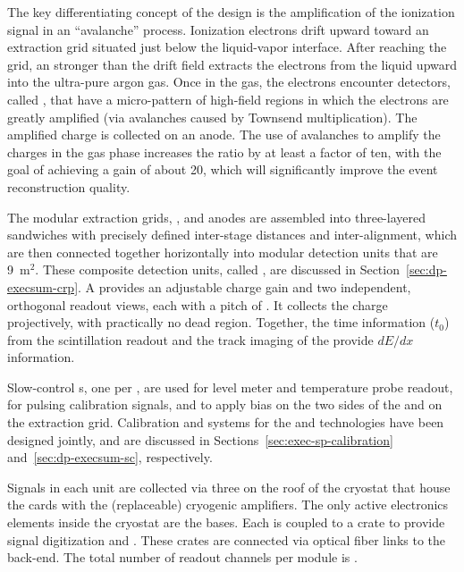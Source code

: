 The key differentiating concept of the  design is the amplification of the ionization signal in an ``avalanche'' process.  Ionization electrons drift upward toward an extraction grid situated just below the liquid-vapor interface. After reaching the grid, an \efield stronger than the drift field extracts the electrons from the liquid upward into the ultra-pure argon gas. 
Once in the gas, the electrons encounter detectors, called , that have a micro-pattern of high-field regions in which the electrons are greatly amplified (via avalanches caused by Townsend multiplication). 
The amplified charge is collected on an anode. The use of avalanches to amplify the charges in the gas phase increases the  ratio by at least
a factor of ten, with the goal of achieving a gain of about 20, which will significantly improve the
event reconstruction quality.



The modular extraction grids, , and anodes are assembled into three-layered sandwiches with precisely defined inter-stage distances and inter-alignment,  which are then connected together horizontally into modular detection units that are \num{9}~m$^2$. These composite detection units, called , are discussed in Section~\ref{sec:dp-execsum-crp}.
A  provides an adjustable charge gain and two independent, orthogonal readout views, each with a pitch of \dpstrippitch. It collects the charge projectively, with practically no dead region. Together, the time information  ($t_0$) from the  scintillation readout and the  \threed track imaging of the  provide $dE/dx$ information.  

Slow-control \fdth{}s,  one per , are used for level meter and temperature probe readout,  for pulsing calibration signals, and to apply  bias on the two sides of the  and on the extraction grid. Calibration and  systems for the  and  technologies have been designed jointly, and are discussed in Sections~\ref{sec:exec-sp-calibration} and~\ref{sec:dp-execsum-sc}, respectively.

Signals in each  unit are collected via three  on the roof of the cryostat that house the  cards with the (replaceable) cryogenic  amplifiers.  The only active electronics elements inside the cryostat are the  bases.  Each  is coupled to a  crate to provide signal digitization and . These crates are connected  via optical fiber links to the  back-end. The total number of readout channels  per \nominalmodsize module is \dpnumcrpch.

